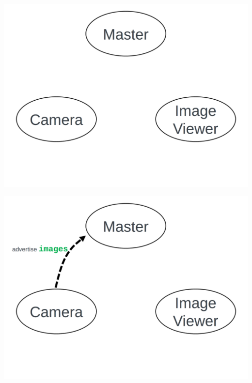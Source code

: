 \documentclass{beamer}
\begin{document}
     \begin{frame}[plain]{}
         \centering
         \includegraphics[width =1.0\linewidth]{figures/master1.png}                                                              
        \end{frame} 
        \begin{frame}[plain]{}
            \centering
            \includegraphics[width =1.0\linewidth]{figures/master2.png}                                                              
        \end{frame} 
\end{document}
